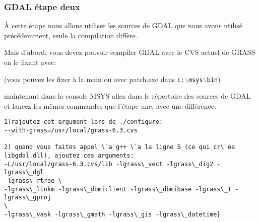 % 
% 
% 

\subsubsection{GDAL \'etape deux}
\`A cette \'etape nous allons utiliser les sources de GDAL que nous avons utilis\'e pr\'ec\'edemment, seule la compilation diff\`ere.

Mais d'abord, vous devez pouvoir compiler GDAL avec le CVS actuel de GRASS en le fixant avec:

 \begin{quotation}
 \end{quotation}
(vous pouvez les fixer \`a la main ou avec patch.exe dans \texttt{c:$\backslash$msys$\backslash$bin})

maintenant dans la console MSYS allez dans le r\'epertoire des sources de GDAL et lancez les m\^emes commandes que l'\'etape une, avec une diff\'erence:

\begin{verbatim}
1)rajoutez cet argument lors de ./configure:
--with-grass=/usr/local/grass-6.3.cvs

2) quand vous faites appel \`a g++ \`a la ligne 5 (ce qui cr\'ee libgdal.dll), ajoutez ces arguments: 
-L/usr/local/grass-6.3.cvs/lib -lgrass\_vect -lgrass\_dig2 -lgrass\_dgl
-lgrass\_rtree \
-lgrass\_linkm -lgrass\_dbmiclient -lgrass\_dbmibase -lgrass\_I -lgrass\_gproj
\ 
-lgrass\_vask -lgrass\_gmath -lgrass\_gis -lgrass\_datetime}
\end{verbatim}

